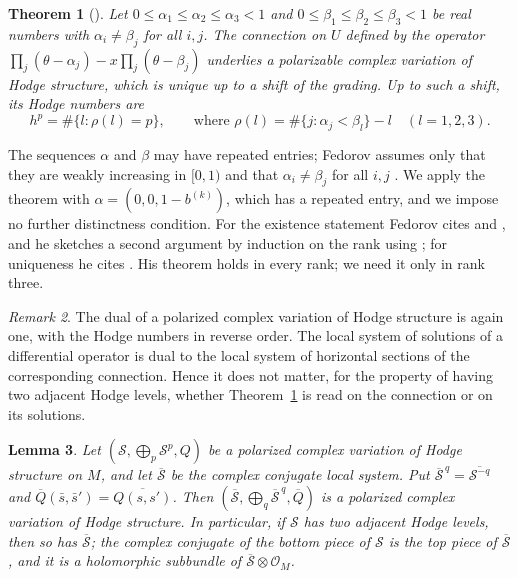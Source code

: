 \documentclass[11pt]{amsart}
\newtheorem{theorem}{Theorem}[section]
\newtheorem{lemma}[theorem]{Lemma}
\theoremstyle{definition}
\theoremstyle{remark}
\newtheorem{remark}[theorem]{Remark}
\numberwithin{equation}{section}
\newcommand{\cS}{\mathcal{S}}
\newcommand{\cO}{\mathcal{O}}
\newcommand{\bk}{b^{(k)}}
\begin{document}
\begin{theorem}[{\citet[Proposition~2.6 and Theorem~1]{Fedorov2018}}]\label{thm:fedorov}
Let $0\le\alpha_1\le\alpha_2\le\alpha_3<1$ and $0\le\beta_1\le\beta_2\le\beta_3<1$ be real numbers with $\alpha_i\ne\beta_j$ for all $i,j$. The connection on $U$ defined by the operator $\prod_j(\theta-\alpha_j)-x\prod_j(\theta-\beta_j)$ underlies a polarizable complex variation of Hodge structure, which is unique up to a shift of the grading. Up to such a shift, its Hodge numbers are
\[
h^p=\#\{l:\rho(l)=p\},\qquad\text{where }\rho(l)=\#\{j:\alpha_j<\beta_l\}-l\quad(l=1,2,3).
\]
\end{theorem}

The sequences $\alpha$ and $\beta$ may have repeated entries; Fedorov assumes only that they are weakly increasing in $[0,1)$ and that $\alpha_i\ne\beta_j$ for all $i,j$ \citep[\S1]{Fedorov2018}. We apply the theorem with $\alpha=(0,0,1-\bk)$, which has a repeated entry, and we impose no further distinctness condition. For the existence statement Fedorov cites \citet[Corollary~8.1]{Simpson1990} and \citet[Theorem~2.4.1]{DettweilerSabbah2013}, and he sketches a second argument by induction on the rank using \citet[Proposition~3.1.1]{DettweilerSabbah2013}; for uniqueness he cites \citet[Proposition~1.13(i)]{Deligne1987}. His theorem holds in every rank; we need it only in rank three.

\begin{remark}\label{rem:dual}
The dual of a polarized complex variation of Hodge structure is again one, with the Hodge numbers in reverse order. The local system of solutions of a differential operator is dual to the local system of horizontal sections of the corresponding connection. Hence it does not matter, for the property of having two adjacent Hodge levels, whether Theorem~\ref{thm:fedorov} is read on the connection or on its solutions.
\end{remark}

\begin{lemma}\label{lem:conj}
Let $(\cS,\bigoplus_p\cS^p,Q)$ be a polarized complex variation of Hodge structure on $M$, and let $\overline{\cS}$ be the complex conjugate local system. Put $\overline{\cS}^{\,q}=\overline{\cS^{-q}}$ and $\overline Q(\bar s,\bar s')=\overline{Q(s,s')}$. Then $(\overline{\cS},\bigoplus_q\overline{\cS}^{\,q},\overline Q)$ is a polarized complex variation of Hodge structure. In particular, if $\cS$ has two adjacent Hodge levels, then so has $\overline{\cS}$; the complex conjugate of the bottom piece of $\cS$ is the top piece of $\overline{\cS}$, and it is a holomorphic subbundle of $\overline{\cS}\otimes\cO_M$.
\end{lemma}
\end{document}
